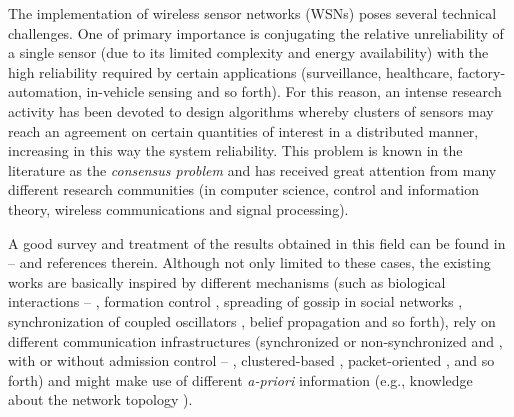 \documentclass[journal]{IEEEtran}
\begin{document}
The implementation of wireless sensor networks (WSNs) poses several technical challenges. One of primary importance is conjugating the relative unreliability of a single sensor (due to its limited complexity and energy availability) with the high reliability required by certain applications (surveillance, healthcare, factory-automation, in-vehicle sensing and so forth). {For this reason, an intense research activity has been devoted to design algorithms whereby clusters of sensors may reach an agreement on certain quantities of interest in a distributed manner, increasing in this way the system reliability.}
This problem is known in the literature as the \emph{consensus problem} and has received great attention from many different research communities (in computer science, control and information theory, wireless communications and signal processing). {A good survey and treatment of the results obtained in this field can be found in \cite{OlFa07} -- \nocite{AyYi09}\nocite{FrGi11}\cite{DiKa10} and references therein. Although not only limited to these cases, the existing works are basically inspired by different mechanisms (such as biological interactions \cite{Barbarossa2007} -- \cite{Charalambous2010}, formation control \cite{WuGu07}, spreading of gossip in social networks \cite{BoGh06}, synchronization of coupled oscillators \cite{SiSp07}, belief propagation \cite{CoGi06} and so forth), rely on different communication infrastructures (synchronized \cite{AvEl11} or non-synchronized \cite{AyYi09} and \cite{BoGh06}, with or without admission control \cite{SiSp08}\nocite{NoBa11} -- \cite{NaDi11}, clustered-based \cite{GoBo12}, packet-oriented \cite{BoGh06}, and so forth) and might make use of different \emph{a-priori} information (e.g., knowledge about the network topology \cite{DiSa08}). 

}
\end{document}
